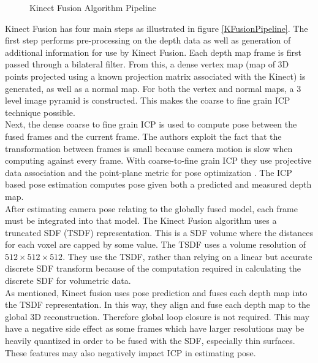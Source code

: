 \begin{figure}[!htb]
\centering
\caption{Kinect Fusion Algorithm Pipeline \cite{Newcombe11Kinectfusion}}
\label{KFusionPipeliciteHne}
\end{figure}

Kinect Fusion has four main steps as illustrated in figure \ref{KFusionPipeline}. The first step performs pre-processing on the depth data as well as generation of additional information for use by Kinect Fusion. Each depth map frame is first passed through a bilateral filter. From this, a dense vertex map (map of 3D points projected using a known projection matrix associated with the Kinect) is generated, as well as a normal map. For both the vertex and normal maps, a 3 level image pyramid is constructed. This makes the coarse to fine grain ICP technique possible. \\

Next, the dense coarse to fine grain ICP is used to compute pose between the fused frames and the current frame. The authors exploit the fact that the transformation between frames is small because camera motion is slow when computing against every frame. With coarse-to-fine grain ICP they use projective data association \cite{Blais95Registering} and the point-plane metric for pose optimization \cite{Rusinkiewicz02Real}. The ICP based pose estimation computes pose given both a predicted and measured depth map. \\

After estimating camera pose relating to the globally fused model, each frame must be integrated into that model. The Kinect Fusion algorithm uses a truncated SDF (TSDF) representation. This is a SDF volume where the distances for each voxel are capped by some value. The TSDF uses a volume resolution of $512\times 512\times 512$. They use the TSDF, rather than relying on a linear but accurate discrete SDF transform \cite{Rasch09Remarks} because of the computation required in calculating the discrete SDF for volumetric data. \\

As mentioned, Kinect fusion uses pose prediction and fuses each depth map into the TSDF representation. In this way, they align and fuse each depth map to the global 3D reconstruction. Therefore global loop closure is not required. This may have a negative side effect as some frames which have larger resolutions may be heavily quantized in order to be fused with the SDF, especially thin surfaces. These features may also negatively impact ICP in estimating pose. \\


